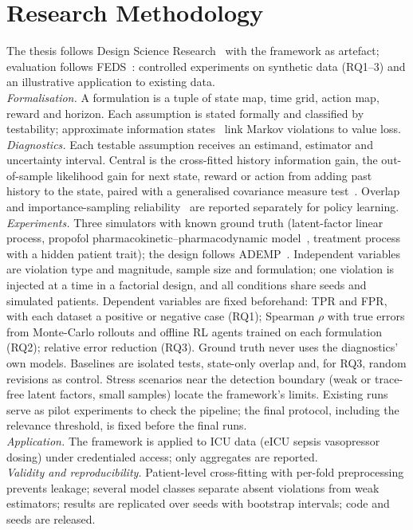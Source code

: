 \documentclass[runningheads]{llncs}
\begin{document}
\section{Research Methodology}
The thesis follows Design Science Research~\cite{Hevner2004,Peffers2007} with the framework as artefact; evaluation follows FEDS~\cite{Venable2016}: controlled experiments on synthetic data (RQ1--3) and an illustrative application to existing data. \\
\emph{Formalisation.} A formulation is a tuple of state map, time grid, action map, reward and horizon. Each assumption is stated formally and classified by testability; approximate information states~\cite{Subramanian2022} link Markov violations to value loss. \\
\emph{Diagnostics.} Each testable assumption receives an estimand, estimator and uncertainty interval. Central is the cross-fitted history information gain, the out-of-sample likelihood gain for next state, reward or action from adding past history to the state, paired with a generalised covariance measure test~\cite{Shah2020}. Overlap and importance-sampling reliability~\cite{Petersen2012} are reported separately for policy learning.
\emph{Experiments.} Three simulators with known ground truth (latent-factor linear process, propofol pharmacokinetic--pharmacodynamic model~\cite{Schnider1998}, treatment process with a hidden patient trait); the design follows ADEMP~\cite{Morris2019}. Independent variables are violation type and magnitude, sample size and formulation; one violation is injected at a time in a factorial design, and all conditions share seeds and simulated patients. Dependent variables are fixed beforehand: TPR and FPR, with each dataset a positive or negative case (RQ1); Spearman $\rho$ with true errors from Monte-Carlo rollouts and offline RL agents trained on each formulation (RQ2); relative error reduction (RQ3). Ground truth never uses the diagnostics' own models. Baselines are isolated tests, state-only overlap and, for RQ3, random revisions as control. Stress scenarios near the detection boundary (weak or trace-free latent factors, small samples) locate the framework's limits. Existing runs serve as pilot experiments to check the pipeline; the final protocol, including the relevance threshold, is fixed before the final runs. \\
\emph{Application.} The framework is applied to ICU data (eICU sepsis vasopressor dosing) under credentialed access; only aggregates are reported. \\
\emph{Validity and reproducibility.} Patient-level cross-fitting with per-fold preprocessing prevents leakage; several model classes separate absent violations from weak estimators; results are replicated over seeds with bootstrap intervals; code and seeds are released.
\end{document}
